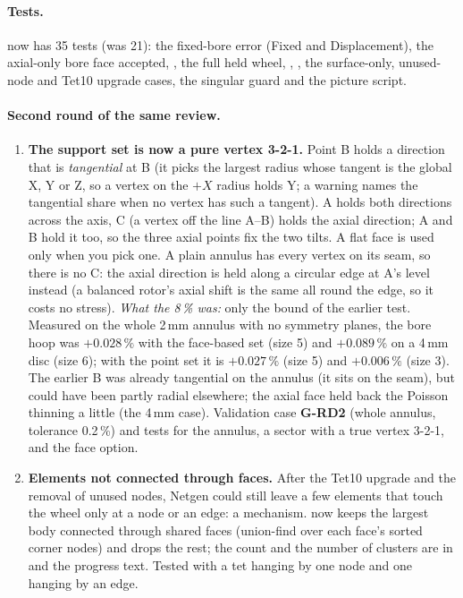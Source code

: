 \paragraph{Tests.}  now has 35 tests (was 21): the fixed-bore error (Fixed and Displacement), the
axial-only bore face accepted, , the full held wheel, , , the
surface-only, unused-node and Tet10 upgrade cases, the singular guard and the picture script.

\paragraph{Second round of the same review.}
\begin{enumerate}[nosep]
  \item \textbf{The support set is now a pure vertex 3-2-1.} Point B holds a direction that is \emph{tangential} at B (it
        picks the largest radius whose tangent is the global X, Y or Z, so a vertex on the $+X$ radius holds Y; a warning
        names the tangential share when no vertex has such a tangent). A holds both directions across the axis, C (a vertex
        off the line A--B) holds the axial direction; A and B hold it too, so the three axial points fix the two tilts. A
        flat face is used only when you pick one. A plain annulus has every vertex on its seam, so there is no C: the axial
        direction is held along a circular edge at A's level instead (a balanced rotor's axial shift is the same all round the
        edge, so it costs no stress). \emph{What the 8\,\% was:} only the bound of the earlier test. Measured on the whole 2\,mm
        annulus with no symmetry planes, the bore hoop was $+0.028\,\%$ with the face-based set (size 5) and $+0.089\,\%$ on a
        4\,mm disc (size 6); with the point set it is $+0.027\,\%$ (size 5) and $+0.006\,\%$ (size 3). The earlier B was already
        tangential on the annulus (it sits on the seam), but could have been partly radial elsewhere; the axial face held back
        the Poisson thinning a little (the 4\,mm case). Validation case \textbf{G-RD2} (whole annulus, tolerance 0.2\,\%) and
        tests for the annulus, a sector with a true vertex 3-2-1, and the face option.
  \item \textbf{Elements not connected through faces.} After the Tet10 upgrade and the removal of unused nodes, Netgen could
        still leave a few elements that touch the wheel only at a node or an edge: a mechanism.  now keeps the
        largest body connected through shared faces (union-find over each face's sorted corner nodes) and drops the rest; the
        count and the number of clusters are in  and the progress text. Tested with a tet hanging by one
        node and one hanging by an edge.
\end{enumerate}

